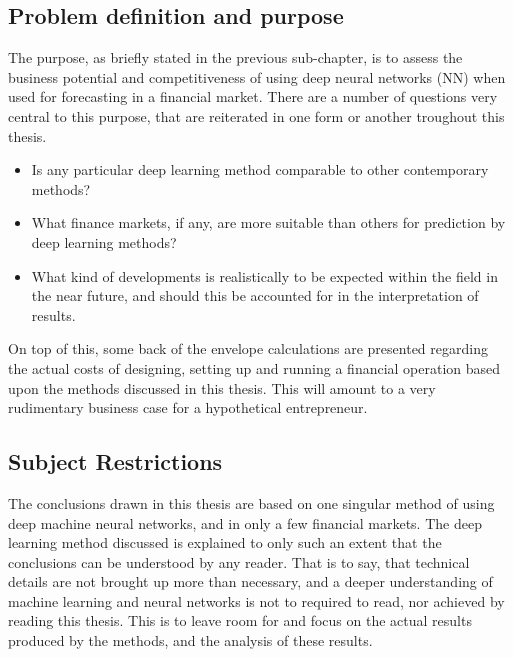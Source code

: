 \subsection{Problem definition and purpose}

The purpose, as briefly stated in the previous sub-chapter, is to assess the business potential and competitiveness of using deep neural networks (NN) when used for forecasting in a financial market. There are a number of questions very central to this purpose, that are reiterated in one form or another troughout this thesis.

\begin{itemize}

\item Is any particular deep learning method comparable to other contemporary methods?

\item What finance markets, if any, are more suitable than others for prediction by deep learning methods?

\item What kind of developments is realistically to be expected within the field in the near future, and should this be accounted for in the interpretation of results.

\end{itemize}

On top of this, some back of the envelope calculations are presented regarding the actual costs of designing, setting up and running a financial operation based upon the methods discussed in this thesis. This will amount to a very rudimentary business case for a hypothetical entrepreneur.



\subsection{Subject Restrictions}

The conclusions drawn in this thesis are based on one singular method of using deep machine neural networks, and in only a few financial markets. The deep learning method discussed is explained to only such an extent that the conclusions can be understood by any reader. That is to say, that technical details are not brought up more than necessary, and a deeper understanding of machine learning and neural networks is not to required to read, nor achieved by reading this thesis. This is to leave room for and focus on the actual results produced by the methods, and the analysis of these results.

